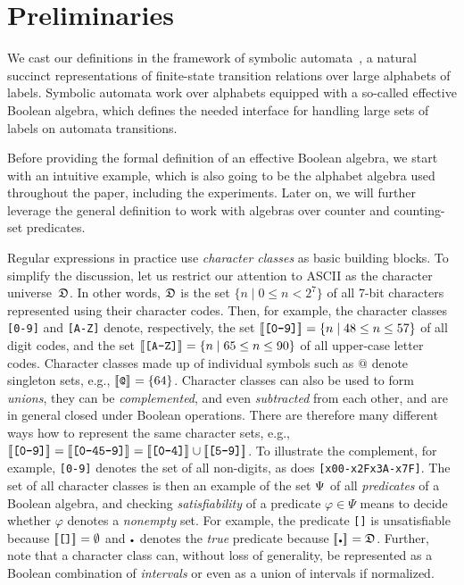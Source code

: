\documentclass[acmsmall,screen]{acmart}
\begin{document}
\section{Preliminaries}\label{sec:prelims}

We cast our definitions in the framework of symbolic automata~\cite{DV20},
a natural succinct representations of finite-state transition relations over
large alphabets of labels.
Symbolic automata work over alphabets equipped with a so-called effective
Boolean algebra, which defines the needed interface for handling large sets of
labels on automata transitions.

Before providing the formal definition of an effective Boolean
algebra, we start with an intuitive example, which is also going to
be the alphabet algebra used throughout the paper, including the
experiments. Later on, we will further leverage the general definition
to work with algebras over counter and counting-set predicates.
\begin{ex}
  Regular expressions in practice use \emph{character classes} as
  basic building blocks.  To simplify the discussion, let us restrict
  our attention to ASCII as the character universe~$\mathfrak{D}$.
  In other
  words, $\mathfrak{D}$ is the set $\{n\mid 0\leq n
  < 2^7\}$ of all 7-bit characters represented using their character codes.
  Then, for example,
  the character classes \texttt{[0-9]} and \texttt{[A-Z]} denote,
  respectively, the set $[\![\texttt{[0-9]}]\!]_{{}}=\{n\mid 48\leq n\leq
  57\}$ of all digit codes, and the set $[\![\texttt{[A-Z]}]\!]_{{}}=\{n\mid
  65\leq n\leq 90\}$ of all upper-case letter codes.  Character
  classes made up of individual symbols such as $\texttt{@}$ denote
  singleton sets, e.g., $[\![\texttt{@}]\!]_{{}}=\{64\}$.  Character classes
  can also be used to form \emph{unions}, they can be \emph{complemented}, and even
  \emph{subtracted} from each other, and are in general closed under
  Boolean operations.  There are therefore many different ways how to
  represent the same character sets, e.g.,
  $\den{\texttt{[0-9]}}=\den{\texttt{[0-45-9]}}=\den{\texttt{[0-4]}}\cup\den{\texttt{[5-9]}}$.
  To illustrate the complement, for example, \texttt{[{\caret}0-9]} denotes
  the set of all non-digits, as does
  \texttt{[{\bslash}x00-{\bslash}x2F{\bslash}x3A-{\bslash}x7F]}.
  The set of all character classes is then an example of the set $\Psi$ of
  all \emph{predicates} of a Boolean algebra, and checking \emph{satisfiability} of a
  predicate $\varphi\in\Psi$ means to decide whether $\varphi$ denotes a
  \emph{nonempty} set.
  For example, the predicate \texttt{[]} is
  unsatisfiable because $[\![\texttt{[]}]\!]_{{}} = \emptyset$ and
  $\DOT$ denotes the \emph{true} predicate because $\den{\DOT}=\DOM$.
  Further, note
  that a character class can, without loss of generality, be represented as a
  Boolean combination of \emph{intervals} or even as a union of
  intervals if normalized.
\end{ex}
\end{document}
